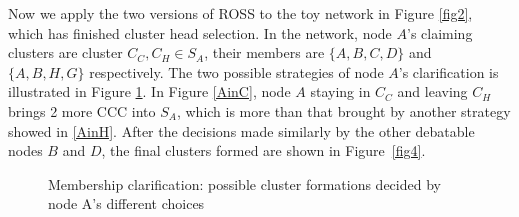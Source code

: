 \documentclass[10pt,journal,compsoc]{IEEEtran}
\theoremstyle{mytheoremstyle}
\theoremstyle{mytheoremstyle}
\theoremstyle{mytheoremstyle}
\begin{document}
Now we apply the two versions of ROSS to the toy network in Figure \ref{fig2}, which has finished cluster head selection.
In the network, node $A$'s claiming clusters are cluster $C_C, C_H\in S_A$, their members are $\{A,B,C,D\}$ and $\{A,B,H,G\}$ respectively. 
The two possible strategies of node $A$'s clarification is illustrated in Figure \ref{fig3}.
In Figure \ref{AinC}, node $A$ staying in $C_C$ and leaving $C_H$ brings 2 more CCC into $S_A$, which is more than that brought by another strategy showed in \ref{AinH}.
After the decisions made similarly by the other debatable nodes $B$ and $D$, the final clusters formed are shown in Figure~\ref{fig4}.



\begin{figure}[h]
\centering
{}
\hspace{.15 in}
\caption[]{Membership clarification: possible cluster formations decided by node A's different choices} %
\label{fig3}
\end{figure}
\end{document}
